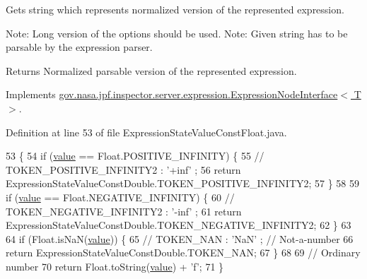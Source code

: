 Gets string which represents normalized version of the represented expression. 

Note\+: Long version of the options should be used. Note\+: Given string has to be parsable by the expression parser.

\begin{DoxyReturn}{Returns}
Normalized parsable version of the represented expression. 
\end{DoxyReturn}


Implements \hyperlink{interfacegov_1_1nasa_1_1jpf_1_1inspector_1_1server_1_1expression_1_1_expression_node_interface_ae5387d8da0126c1256a786d54b9bd7ce}{gov.\+nasa.\+jpf.\+inspector.\+server.\+expression.\+Expression\+Node\+Interface$<$ T $>$}.



Definition at line 53 of file Expression\+State\+Value\+Const\+Float.\+java.


\begin{DoxyCode}
53                                            \{
54     \textcolor{keywordflow}{if} (\hyperlink{classgov_1_1nasa_1_1jpf_1_1inspector_1_1server_1_1expression_1_1expressions_1_1_expression_state_value_const_float_a19b7c4061f54cd4ef3121ebb9d6c8e65}{value} == Float.POSITIVE\_INFINITY) \{
55       \textcolor{comment}{// TOKEN\_POSITIVE\_INFINITY2 : '+inf' ;}
56       \textcolor{keywordflow}{return} ExpressionStateValueConstDouble.TOKEN\_POSITIVE\_INFINITY2;
57     \}
58 
59     \textcolor{keywordflow}{if} (\hyperlink{classgov_1_1nasa_1_1jpf_1_1inspector_1_1server_1_1expression_1_1expressions_1_1_expression_state_value_const_float_a19b7c4061f54cd4ef3121ebb9d6c8e65}{value} == Float.NEGATIVE\_INFINITY) \{
60       \textcolor{comment}{// TOKEN\_NEGATIVE\_INFINITY2 : '-inf' ;}
61       \textcolor{keywordflow}{return} ExpressionStateValueConstDouble.TOKEN\_NEGATIVE\_INFINITY2;
62     \}
63 
64     \textcolor{keywordflow}{if} (Float.isNaN(\hyperlink{classgov_1_1nasa_1_1jpf_1_1inspector_1_1server_1_1expression_1_1expressions_1_1_expression_state_value_const_float_a19b7c4061f54cd4ef3121ebb9d6c8e65}{value})) \{
65       \textcolor{comment}{// TOKEN\_NAN : 'NaN' ; // Not-a-number}
66       \textcolor{keywordflow}{return} ExpressionStateValueConstDouble.TOKEN\_NAN;
67     \}
68 
69     \textcolor{comment}{// Ordinary number}
70     \textcolor{keywordflow}{return} Float.toString(\hyperlink{classgov_1_1nasa_1_1jpf_1_1inspector_1_1server_1_1expression_1_1expressions_1_1_expression_state_value_const_float_a19b7c4061f54cd4ef3121ebb9d6c8e65}{value}) + \textcolor{charliteral}{'f'};
71   \}
\end{DoxyCode}

